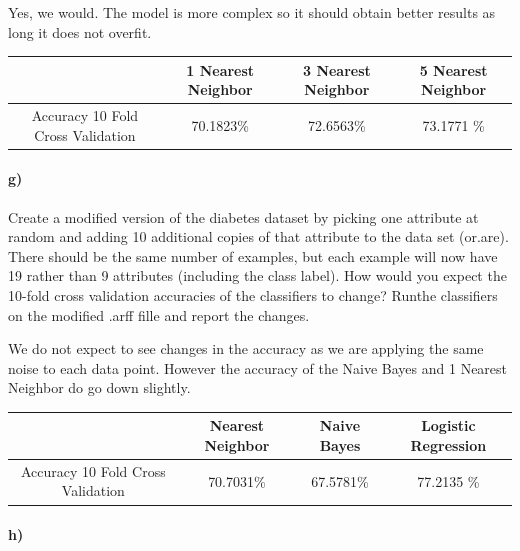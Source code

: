 \documentclass{article}
\begin{document}
Yes, we would. The model is more complex so it should obtain better results as long it does not overfit. 


\begin{table}[ht]
    \begin{center}
    \begin{tabular}{|c|c|c|c|}
   \hline
        & 1 Nearest Neighbor & 3 Nearest Neighbor  & 5 Nearest Neighbor  \\ \hline
         Accuracy 10 Fold Cross Validation &  70.1823\%&72.6563\% &  73.1771 \%   \\ \hline
       
             
     
    \end{tabular}
    \end{center}
\end{table}

\paragraph{g)}
Create a modified version of the diabetes dataset by picking one attribute at random and adding 10 additional copies of that attribute to the data set (or.are). There should be the same number of examples, but each example will now have 19 rather than 9 attributes (including the class label). How would you expect the 10-fold cross validation accuracies of the classifiers to change? Runthe classifiers on the modified .arff fille and report the changes.

We do not expect to see changes in the accuracy as we are applying the same noise to each data point. However the accuracy of the Naive Bayes and 1 Nearest Neighbor do go down slightly. 



\begin{table}[ht]
    \begin{center}
    \begin{tabular}{|c|c|c|c|}
   \hline
        & Nearest Neighbor & Naive Bayes & Logistic Regression \\ \hline
         Accuracy 10 Fold Cross Validation &  70.7031\%&67.5781\% &  77.2135 \%  \\ \hline
        \end{tabular}
    \end{center}
\end{table}

\paragraph{h)}
\end{document}
